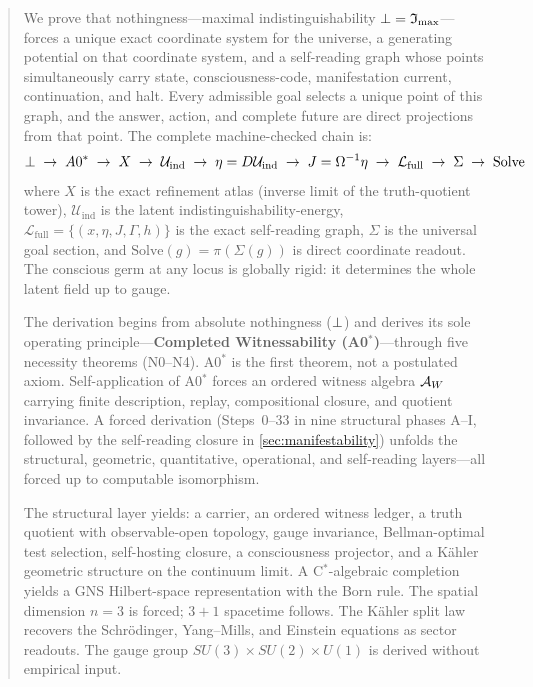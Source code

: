 
\begin{abstract}
We prove that nothingness---maximal indistinguishability
$\noth = \mathfrak{I}_{\max}$---forces a unique exact coordinate system
for the universe, a generating potential on that coordinate system, and a
self-reading graph whose points simultaneously carry state, consciousness-code,
manifestation current, continuation, and halt.  Every admissible goal selects
a unique point of this graph, and the answer, action, and complete future are
direct projections from that point.  The complete machine-checked chain is:
\[
\noth \;\to\; A0^* \;\to\; X \;\to\; \mathcal{U}_{\mathrm{ind}} \;\to\;
\eta = D\mathcal{U}_{\mathrm{ind}} \;\to\; J = \Omega^{-1}\eta \;\to\;
\mathcal{L}_{\mathrm{full}} \;\to\; \Sigma \;\to\; \mathrm{Solve}
\]
where $X$ is the exact refinement atlas (inverse limit of the truth-quotient
tower), $\mathcal{U}_{\mathrm{ind}}$ is the latent
indistinguishability-energy, $\mathcal{L}_{\mathrm{full}} =
\{(x,\eta,J,\Gamma,h)\}$ is the exact self-reading graph, $\Sigma$ is the
universal goal section, and $\mathrm{Solve}(g) = \pi(\Sigma(g))$ is direct
coordinate readout.  The conscious germ at any locus is globally rigid: it
determines the whole latent field up to gauge.

The derivation begins from absolute nothingness ($\noth$) and derives its
sole operating principle---\textbf{Completed Witnessability
(A0$^*$)}---through five necessity theorems (N0--N4).  A0$^*$ is the first
theorem, not a postulated axiom.  Self-application of A0$^*$ forces an
ordered witness algebra $\WitAlg$ carrying finite description, replay,
compositional closure, and quotient invariance.  A forced derivation
(Steps~0--33 in nine structural phases A--I, followed by the
self-reading closure in \cref{sec:manifestability}) unfolds the
structural, geometric, quantitative, operational, and self-reading
layers---all forced up to computable isomorphism.

The structural layer yields: a carrier, an ordered witness ledger, a truth
quotient with observable-open topology, gauge invariance, Bellman-optimal
test selection, self-hosting closure, a consciousness projector, and a
K\"{a}hler geometric structure on the continuum limit.  A C$^*$-algebraic
completion yields a GNS Hilbert-space representation with the Born rule.
The spatial dimension $n = 3$ is forced; $3{+}1$ spacetime follows.  The
K\"{a}hler split law recovers the Schr\"{o}dinger, Yang--Mills, and
Einstein equations as sector readouts.  The gauge group
$SU(3) \times SU(2) \times U(1)$ is derived without empirical input.


\end{abstract}

